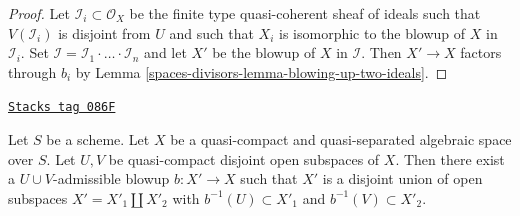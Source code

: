 \begin{proof}
Let $\mathcal{I}_i \subset \mathcal{O}_X$ be the finite type
quasi-coherent sheaf of ideals such that $V(\mathcal{I}_i)$ is
disjoint from $U$ and such that $X_i$ is isomorphic to the
blowup of $X$ in $\mathcal{I}_i$. Set
$\mathcal{I} = \mathcal{I}_1 \cdot \ldots \cdot \mathcal{I}_n$
and let $X'$ be the blowup of $X$ in $\mathcal{I}$. Then
$X' \to X$ factors through $b_i$ by Lemma \ref{spaces-divisors-lemma-blowing-up-two-ideals}.
\end{proof}

\begin{lemma}
\label{spaces-divisors-lemma-separate-disjoint-opens-by-blowing-up}
\href{https://stacks.math.columbia.edu/tag/086F}{\texttt{Stacks tag 086F}}

Let $S$ be a scheme.
Let $X$ be a quasi-compact and quasi-separated algebraic space over $S$.
Let $U, V$ be quasi-compact disjoint open subspaces of $X$.
Then there exist a $U \cup V$-admissible blowup $b : X' \to X$
such that $X'$ is a disjoint union of open subspaces
$X' = X'_1 \amalg X'_2$ with $b^{-1}(U) \subset X'_1$ and
$b^{-1}(V) \subset X'_2$.
\end{lemma}

